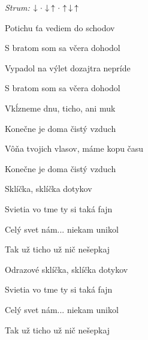 \begin{song}


\begin{headerbox}
\textit{Strum:} $\Down\Miss\Down\Up\Miss\Up\Down\Up$
\end{headerbox}

\begin{hchordbox}
\end{hchordbox}

\Large

\bigskip

Potichu ťa vediem do schodov \par
{}S bratom som sa včera dohodol \par
{}Vypadol na výlet dozajtra nepríde \par
{}S bratom som sa včera dohodol \par

\bigskip

Vkĺzneme dnu, ticho, ani muk \par
{}Konečne je doma čistý vzduch \par
{}Vôňa tvojich vlasov, máme kopu času \par
{}Konečne je doma čistý vzduch \par

\bigskip

\begin{chorusbox}{\Refren}
Sklíčka, sklíčka dotykov \par
{}Svietia vo tme ty si taká fajn \par
Celý svet nám... niekam unikol \par
{}Tak už ticho už nič nešepkaj \par

\bigskip

Odrazové sklíčka, sklíčka dotykov \par
{}Svietia vo tme ty si taká fajn \par
Celý svet nám... niekam unikol \par
{}Tak už ticho už nič nešepkaj \par
\end{chorusbox}


\end{song}

